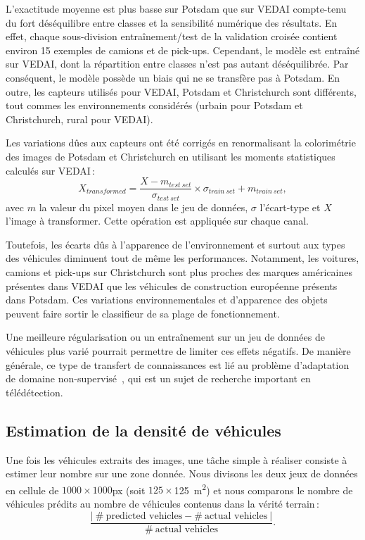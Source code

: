 L'exactitude moyenne est plus basse sur Potsdam que sur \gls{VEDAI} compte-tenu du fort déséquilibre entre classes et la sensibilité numérique des résultats. En effet, chaque sous-division entraînement/test de la validation croisée contient environ 15 exemples de camions et de pick-ups. Cependant, le modèle est entraîné sur \gls{VEDAI}, dont la répartition entre classes n'est pas autant déséquilibrée. Par conséquent, le modèle possède un biais qui ne se transfère pas à Potsdam. En outre, les capteurs utilisés pour \gls{VEDAI}, Potsdam et Christchurch sont différents, tout commes les environnements considérés (urbain pour Potsdam et Christchurch, rural pour \gls{VEDAI}).

Les variations dûes aux capteurs ont été corrigés en renormalisant la colorimétrie des images de Potsdam et Christchurch en utilisant les moments statistiques calculés sur \gls{VEDAI}\,:
\begin{equation}
X_{transformed} = \frac{X - m_{test~set}}{\sigma_{test~set}} \times \sigma_{train~set} + m_{train~set},
\end{equation}
avec $m$ la valeur du pixel moyen dans le jeu de données, $\sigma$ l'écart-type et $X$ l'image à transformer. Cette opération est appliquée sur chaque canal.

Toutefois, les écarts dûs à l'apparence de l'environnement et surtout aux types des véhicules diminuent tout de même les performances. Notamment, les voitures, camions et pick-ups sur Christchurch sont plus proches des marques américaines présentes dans \gls{VEDAI} que les véhicules de construction européenne présents dans Potsdam. Ces variations environnementales et d'apparence des objets peuvent faire sortir le classifieur de sa plage de fonctionnement.

Une meilleure régularisation ou un entraînement sur un jeu de données de véhicules plus varié pourrait permettre de limiter ces effets négatifs. De manière générale, ce type de transfert de connaissances est lié au problème d'adaptation de domaine non-supervisé~\cite{tuia_domain_2016,courty_optimal_2016}, qui est un sujet de recherche important en télédétection.

\subsection{Estimation de la densité de véhicules}

Une fois les véhicules extraits des images, une tâche simple à réaliser consiste à estimer leur nombre sur une zone donnée. Nous divisons les deux jeux de données en cellule de $1000\times1000$px (soit $125\times$\SI{125}{\meter\squared}) et nous comparons le nombre de véhicules prédits au nombre de véhicules contenus dans la vérité terrain\,:
\begin{equation}
\frac{|~\#~\text{predicted vehicles} - \#~\text{actual vehicles}~|}{\#~\text{actual vehicles}}.
\end{equation}

